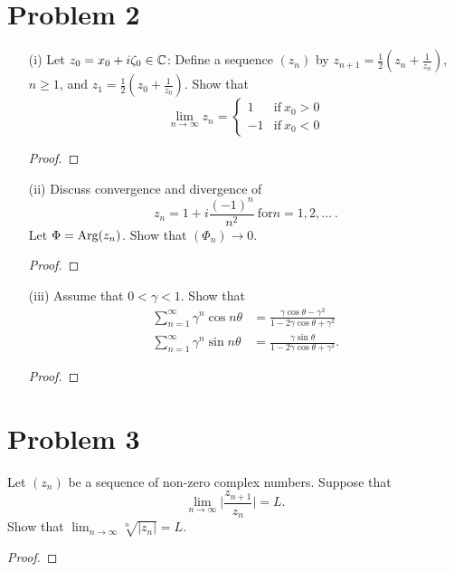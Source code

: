 \documentclass[a4paper]{article}
\begin{document}
\section{Problem 2}
\begin{enumerate}
    \item[(i)] Let \( {z}_{0} = {x}_{0} + i {\zeta}_{0} \in \mathbb{C}  \): Define a sequence \( ({z}_{n}) \) by \( {z}_{n+1} = \frac{ 1 }{ 2 }  ({z}_{n} + \frac{ 1 }{ {z}_{n} } ) \), \( n \geq 1  \), and \( {z}_{1} = \frac{ 1 }{ 2 }  ({z}_{0} + \frac{ 1 }{ {z}_{0} } ) \). 
        Show that 
        \[  \lim_{ n  \to \infty  } {z}_{n} = 
        \begin{cases}
            1 &\text{if} \ {x}_{0} > 0 \\
            -1 &\text{if}  \ {x}_{0} < 0 
        \end{cases}   \]
    \begin{proof}
    
    \end{proof}
    \item[(ii)] Discuss convergence and divergence of 
        \[  {z}_{n} = 1 + i \frac{ (-1)^{n} }{ n^{2} } \ \text{for} n = 1,2,\dots \ . \]
        Let \( \Phi = \operatorname{Arg}({z}_{n}) \). Show that \( ({\Phi}_{n}) \to 0 \).
        \begin{proof}
        
        \end{proof}
    \item[(iii)] Assume that \( 0 < \gamma < 1  \). Show that 
        \begin{align*}
            \sum_{ n=1  }^{ \infty  } \gamma^{n} \cos n \theta &= \frac{ \gamma \cos \theta - \gamma^{2} }{ 1 - 2 \gamma \cos \theta + \gamma^{2} } \\
            \sum_{ n=1  }^{ \infty  } \gamma^{n} \sin n \theta &= \frac{  \gamma \sin \theta   }{  1 - 2 \gamma \cos \theta + \gamma^{2} }. 
    \end{align*}
        \begin{proof}

        \end{proof}
\end{enumerate}

\section{Problem 3}
Let \( ({z}_{n}) \) be a sequence of non-zero complex numbers. Suppose that 
\[  \lim_{ n \to \infty  }  \Big| \frac{ {z}_{n+1}  }{ {z}_{n} }  \Big|  = L. \]
Show that \( \lim_{ n \to \infty  } \sqrt[n]{ | {z}_{n} |   }  = L  \).
\begin{proof}

\end{proof}
\end{document}
